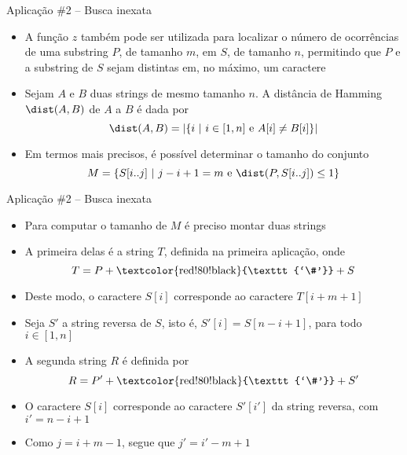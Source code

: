 \begin{frame}[fragile]{Aplicação \#2 -- Busca inexata}

    \begin{itemize}
        \item A função $z$ também pode ser utilizada para localizar o número de ocorrências
            de uma substring $P$, de tamanho $m$, em $S$, de tamanho $n$, permitindo que $P$
            e a substring de $S$ sejam distintas em, no máximo, um caractere

        \item Sejam $A$ e $B$ duas strings de mesmo tamanho $n$. A distância de Hamming $\dist(A, B)$
            de $A$ a $B$ é dada por
        \[
            \dist(A, B) = | \lbrace i\ | \ i\in [1,n]\ \mbox{e}\ A[i] \neq B[i]\rbrace |
        \]
       
        \item Em termos mais precisos, é possível determinar o tamanho do conjunto
        \[
            M = \lbrace S[i..j]\ | \ j - i + 1 = m\ \mbox{e}\ \dist(P, S[i..j])\leq 1\rbrace
        \]
            
    \end{itemize}

\end{frame}

\begin{frame}[fragile]{Aplicação \#2 -- Busca inexata}

    \begin{itemize}
        \item Para computar o tamanho de $M$ é preciso montar duas strings

        \item A primeira delas é a string $T$, definida na primeira aplicação, onde
         \[
            T = P + \mbox{\textcolor{red!80!black}{\texttt{`\#'}}} + S
        \]

        \item Deste modo, o caractere $S[i]$ corresponde ao caractere $T[i + m + 1]$

        \item Seja $S'$ a string reversa de $S$, isto é, $S'[i] = S[n - i + 1]$, para todo
            $i\in [1,n]$

        \item A segunda string $R$ é definida por
         \[
            R = P' + \mbox{\textcolor{red!80!black}{\texttt{`\#'}}} + S'
        \]

        \item O caractere $S[i]$ corresponde ao caractere $S'[i']$ da string 
            reversa, com $i' = n - i + 1$

        \item Como $j = i + m - 1$, segue que $j' = i' - m + 1$ 

    \end{itemize}

\end{frame}

